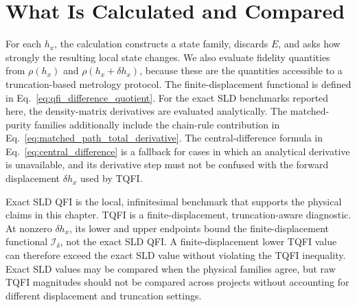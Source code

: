 \section{What Is Calculated and Compared}
\label{sec:noise_observables}

For each $h_x$, the calculation constructs a state family, discards $E$, and asks how strongly the resulting local state changes.  We also evaluate fidelity quantities from $\rho(h_x)$ and $\rho(h_x+\delta h_x)$, because these are the quantities accessible to a truncation-based metrology protocol.  The finite-displacement functional is defined in Eq.~\eqref{eq:qfi_difference_quotient}. For the exact SLD benchmarks reported here, the density-matrix derivatives are evaluated analytically. The matched-purity families additionally include the chain-rule contribution in Eq.~\eqref{eq:matched_path_total_derivative}. The central-difference formula in Eq.~\eqref{eq:central_difference} is a fallback for cases in which an analytical derivative is unavailable, and its derivative step must not be confused with the forward displacement $\delta h_x$ used by TQFI.

\begin{remark}
    Exact SLD QFI is the local, infinitesimal benchmark that supports the physical claims in this chapter. TQFI is a finite-displacement, truncation-aware diagnostic. At nonzero $\delta h_x$, its lower and upper endpoints bound the finite-displacement functional $\mathcal I_{\delta}$, not the exact SLD QFI. A finite-displacement lower TQFI value can therefore exceed the exact SLD value without violating the TQFI inequality. Exact SLD values may be compared when the physical families agree, but raw TQFI magnitudes should not be compared across projects without accounting for different displacement and truncation settings.
\end{remark}

